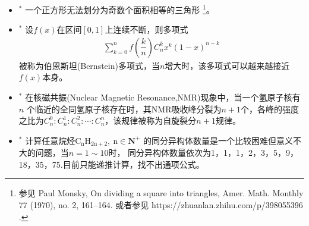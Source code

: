 \begin{itemize}[leftmargin=\inteval{\myitemleftmargin}pt,itemsep=
   \inteval{\myitemitempsep}pt,topsep=\inteval{\myitemtopsep}pt]
\item $^*$ 一个正方形无法划分为奇数个面积相等的三角形
\footnote{参见 Paul Monsky, On dividing a square into triangles, Amer. Math. Monthly 77 (1970), no. 2, 161–164. 或者参见 https://zhuanlan.zhihu.com/p/398055396 . }。

\item $^*$ 设$ f(x) $在区间$ [0,1] $上连续不断，则多项式
\begin{gather*}
    \sum_{k=0}^{n}f\left(\dfrac{k}{n}\right)C_n^kx^k(1-x)^{n-k}
\end{gather*}
被称为伯恩斯坦(Bernstein)多项式，当$ n $增大时，该多项式可以越来越接近$ f(x) $本身。

\item $^*$ 在核磁共振(Nuclear Magnetic Resonance,NMR)现象中，当一个氢原子核有$ n $
个临近的全同氢原子核存在时，其NMR吸收峰分裂为$ n+1 $个，各峰的强度之比为$ 
C_n^0:C_n^1:C_n^2:\cdots :C_n^n $，该规律被称为自旋裂分$ n+1 $规律。

\item $^*$ 计算任意烷烃$ \mathrm{C_nH_{2n+2},\ n}\in \textbf{N}^+ $
的同分异构体数量是一个比较困难但意义不大的问题，当$ n=1\sim 10 $时，
同分异构体数量依次为1，1，1，2，3，5，9，18，35，75.目前只能递推计算，找不出通项公式。

\end{itemize}

